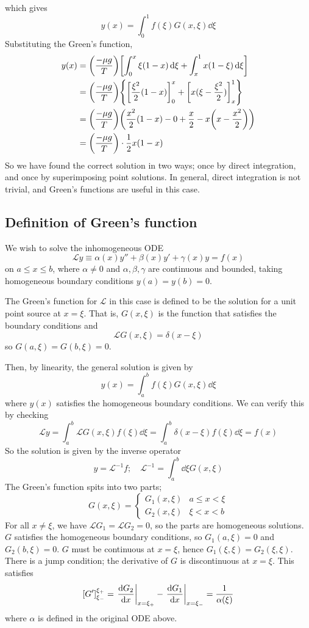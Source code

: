 \documentclass[a4paper]{article}
\begin{document}
which gives
\[
	y(x) = \int_0^1 f(\xi) G(x,\xi) \dd{\xi}
\]
Substituting the Green's function,
\begin{align*}
	y(x) & = \qty(\frac{-\mu g}{T}) \qty[ \int_0^x \xi(1-x) \dd{\xi} + \int_x^1 x(1-\xi) \dd{\xi}]              \\
	     & = \qty(\frac{-\mu g}{T}) \qty{ \qty[\frac{\xi^2}{2}(1-x)]_0^x + \qty[x(\xi - \frac{\xi^2}{2})]_x^1 } \\
	     & = \qty(\frac{-\mu g}{T}) \qty(\frac{x^2}{2}(1-x) - 0 + \frac{x}{2} - x\qty(x-\frac{x^2}{2}))         \\
	     & = \qty(\frac{-\mu g}{T}) \cdot \frac{1}{2}x(1-x)
\end{align*}
So we have found the correct solution in two ways; once by direct integration, and once by superimposing point solutions.
In general, direct integration is not trivial, and Green's functions are useful in this case.

\subsection{Definition of Green's function}
We wish to solve the inhomogeneous ODE
\[
	\mathcal L y \equiv \alpha(x) y'' + \beta(x) y' + \gamma(x) y = f(x)
\]
on \( a \leq x \leq b \), where \( \alpha \neq 0 \) and \( \alpha, \beta, \gamma \) are continuous and bounded, taking homogeneous boundary conditions \( y(a) = y(b) = 0 \).
\begin{definition}
    The Green's function for \( \mathcal L \) in this case is defined to be the solution for a unit point source at \( x = \xi \).
    That is, \( G(x,\xi) \) is the function that satisfies the boundary conditions and
    \[
        \mathcal L G(x,\xi) = \delta(x-\xi)
    \]
    so \( G(a,\xi) = G(b,\xi) = 0 \).
\end{definition}
Then, by linearity, the general solution is given by
\[
	y(x) = \int_a^b f(\xi) G(x,\xi) \dd{\xi}
\]
where \( y(x) \) satisfies the homogeneous boundary conditions.
We can verify this by checking
\[
	\mathcal L y = \int_a^b \mathcal L G(x,\xi) f(\xi) \dd{\xi} = \int_a^b \delta(x-\xi) f(\xi) \dd{\xi} = f(x)
\]
So the solution is given by the inverse operator
\[
	y = \mathcal L^{-1} f;\quad \mathcal L^{-1} = \int_a^b \dd{\xi} G(x,\xi)
\]
The Green's function spits into two parts;
\[
	G(x,\xi) = \begin{cases}
		G_1(x,\xi) & a \leq x < \xi \\
		G_2(x,\xi) & \xi < x < b
	\end{cases}
\]
For all \( x \neq \xi \), we have \( \mathcal L G_1 = \mathcal L G_2 = 0 \), so the parts are homogeneous solutions.
\( G \) satisfies the homogeneous boundary conditions, so \( G_1(a, \xi) = 0 \) and \( G_2(b, \xi) = 0 \).
\( G \) must be continuous at \( x = \xi \), hence \( G_1(\xi, \xi) = G_2(\xi, \xi) \).
There is a jump condition; the derivative of \( G \) is discontinuous at \( x = \xi \).
This satisfies
\[
	[G']_{\xi_-}^{\xi_+} = \eval{\dv{G_2}{x}}_{x = \xi_+} - \eval{\dv{G_1}{x}}_{x = \xi_-} = \frac{1}{\alpha(\xi)}
\]
where $ \alpha $ is defined in the original ODE above. 
\end{document}
